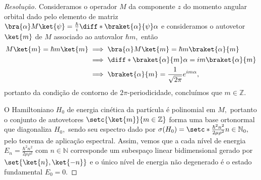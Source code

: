 \begin{proof}[Resolução]
   Consideramos o operador \(M\) da componente \(z\) do momento angular orbital dado pelo elemento de matriz \(\bra{\alpha} M \ket{\psi} = \frac{\hbar}{i} \diff*{\braket{\alpha}{\psi}}{\alpha}\) e consideramos o autovetor \(\ket{m}\) de \(M\) associado ao autovalor \(\hbar m,\) então
   \begin{align*}
      M \ket{m} = \hbar m \ket{m} &\implies \bra{\alpha} M \ket{m} = \hbar m \braket{\alpha}{m}\\
                                  &\implies \diff*{\braket{\alpha}{m}}{\alpha} = im \braket{\alpha}{m}\\
                                  &\implies \braket{\alpha}{m} = \frac{1}{\sqrt{2\pi}} e^{i m \alpha},
   \end{align*}
   portanto da condição de contorno de \(2\pi\)-periodicidade, concluímos que \(m \in \mathbb{Z}\).

   O Hamiltoniano \(H_0\) de energia cinética da partícula é polinomial em \(M,\) portanto o conjunto de autovetores \(\setc{\ket{m}}{m \in \mathbb{Z}}\) forma uma base ortonormal que diagonaliza \(H_0,\) sendo seu espectro dado por \(\sigma(H_0) = \setc*{\frac{\hbar^2n^2}{2\mu \rho^2}}{n \in \mathbb{N}_0},\) pelo teorema de aplicação espectral. Assim, vemos que a cada nível de energia \(E_n = \frac{\hbar^2n^2}{2\mu \rho^2}\) com \(n \in \mathbb{N}\) corresponde um subespaço linear bidimensional gerado por \(\set{\ket{n}, \ket{-n}}\) e o único nível de energia não degenerado é o estado fundamental \(E_0 = 0.\)


\end{proof}
